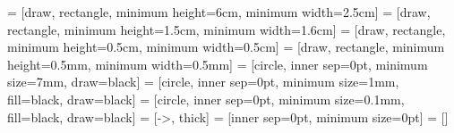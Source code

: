      = [draw, rectangle, minimum height=6cm, minimum width=2.5cm]
     = [draw, rectangle, minimum height=1.5cm, minimum width=1.6cm]
     = [draw, rectangle, minimum height=0.5cm, minimum width=0.5cm]
     = [draw, rectangle, minimum height=0.5mm, minimum width=0.5mm]
     = [circle, inner sep=0pt, minimum size=7mm, draw=black]
    = [circle, inner sep=0pt, minimum size=1mm, fill=black, draw=black]
    = [circle, inner sep=0pt, minimum size=0.1mm, fill=black, draw=black]
 = [->, thick]
     = [inner sep=0pt, minimum size=0pt]
     = []

